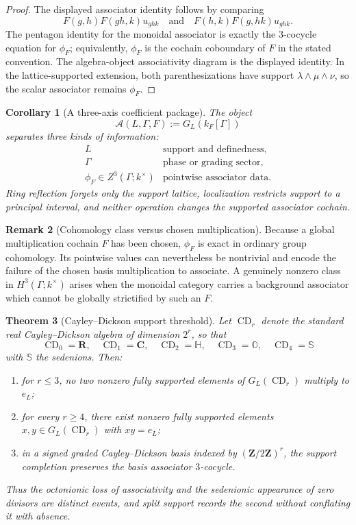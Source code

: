 \documentclass[11pt]{amsart}
\numberwithin{equation}{section}
\newtheorem{theorem}{Theorem}[section]
\newtheorem{corollary}[theorem]{Corollary}
\theoremstyle{definition}
\newtheorem{remark}[theorem]{Remark}
\newcommand{\Z}{\mathbf Z}
\newcommand{\R}{\mathbf R}
\newcommand{\C}{\mathbf C}
\newcommand{\CD}{\operatorname{CD}}
\begin{document}
\begin{proof}
The displayed associator identity follows by comparing
\[
F(g,h)F(gh,k)u_{ghk}
\quad\text{and}\quad
F(h,k)F(g,hk)u_{ghk}.
\]
The pentagon identity for the monoidal associator is exactly the
$3$-cocycle equation for $\phi_F$; equivalently, $\phi_F$ is the
cochain coboundary of $F$ in the stated convention.  The algebra-object
associativity diagram is the displayed identity.  In the
lattice-supported extension, both parenthesizations have support
$\lambda\wedge\mu\wedge\nu$, so the scalar associator remains
$\phi_F$.
\end{proof}

\begin{corollary}[A three-axis coefficient package]
\label{cor:support-phase-associator-package}
The object
\[
\mathscr A(L,\Gamma,F):=G_L(k_F[\Gamma])
\]
separates three kinds of information:
\[
\begin{array}{c|c}
L&\text{support and definedness},\\
\Gamma&\text{phase or grading sector},\\
\phi_F\in Z^3(\Gamma;k^\times)&\text{pointwise associator data}.
\end{array}
\]
Ring reflection forgets only the support lattice, localization restricts
support to a principal interval, and neither operation changes the
supported associator cochain.
\end{corollary}

\begin{remark}[Cohomology class versus chosen multiplication]
Because a global multiplication cochain $F$ has been chosen,
$\phi_F$ is exact in ordinary group cohomology.  Its pointwise values can
nevertheless be nontrivial and encode the failure of the chosen basis
multiplication to associate.  A genuinely nonzero class in
$H^3(\Gamma;k^\times)$ arises when the monoidal category carries a
background associator which cannot be globally strictified by such an
$F$.
\end{remark}

\begin{theorem}[Cayley--Dickson support threshold]
\label{thm:cayley-dickson-support-threshold}
Let $\CD_r$ denote the standard real Cayley--Dickson algebra of dimension
$2^r$, so that
\[
\CD_0=\R,
\quad
\CD_1=\C,
\quad
\CD_2=\mathbb H,
\quad
\CD_3=\mathbb O,
\quad
\CD_4=\mathbb S
\]
with $\mathbb S$ the sedenions.  Then:
\begin{enumerate}[label=\textup{(\arabic*)}]
\item for $r\leq3$, no two nonzero fully supported elements of
$G_L(\CD_r)$ multiply to $e_L$;
\item for every $r\geq4$, there exist nonzero fully supported elements
$x,y\in G_L(\CD_r)$ with $xy=e_L$;
\item in a signed graded Cayley--Dickson basis indexed by
$(\Z/2\Z)^r$, the support completion preserves the basis associator
$3$-cocycle.
\end{enumerate}
Thus the octonionic loss of associativity and the sedenionic appearance of
zero divisors are distinct events, and split support records the second
without conflating it with absence.
\end{theorem}
\end{document}
